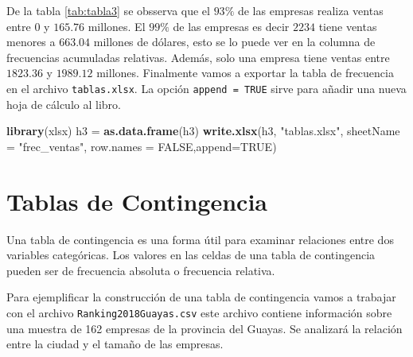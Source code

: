\documentclass[]{book}
\newenvironment{Shaded}{\begin{snugshade}}{\end{snugshade}}
\newcommand{\KeywordTok}[1]{\textcolor[rgb]{0.13,0.29,0.53}{\textbf{#1}}}
\newcommand{\DataTypeTok}[1]{\textcolor[rgb]{0.13,0.29,0.53}{#1}}
\newcommand{\DecValTok}[1]{\textcolor[rgb]{0.00,0.00,0.81}{#1}}
\newcommand{\StringTok}[1]{\textcolor[rgb]{0.31,0.60,0.02}{#1}}
\newcommand{\OtherTok}[1]{\textcolor[rgb]{0.56,0.35,0.01}{#1}}
\newcommand{\OperatorTok}[1]{\textcolor[rgb]{0.81,0.36,0.00}{\textbf{#1}}}
\newcommand{\NormalTok}[1]{#1}
\begin{document}
De la tabla \ref{tab:tabla3} se obsserva que el \(93\%\) de las empresas
realiza ventas entre 0 y \(165.76\) millones. El \(99\%\) de las
empresas es decir \(2234\) tiene ventas menores a \(663.04\) millones de
dólares, esto se lo puede ver en la columna de frecuencias acumuladas
relativas. Además, solo una empresa tiene ventas entre \(1823.36\) y
\(1989.12\) millones. Finalmente vamos a exportar la tabla de frecuencia
en el archivo \texttt{tablas.xlsx}. La opción \texttt{append\ =\ TRUE}
sirve para añadir una nueva hoja de cálculo al libro.

\begin{Shaded}
\begin{Highlighting}[]
\KeywordTok{library}\NormalTok{(xlsx)}
\NormalTok{h3 =}\StringTok{ }\KeywordTok{as.data.frame}\NormalTok{(h3)}
\KeywordTok{write.xlsx}\NormalTok{(h3, }\StringTok{"tablas.xlsx"}\NormalTok{, }\DataTypeTok{sheetName =} \StringTok{"frec_ventas"}\NormalTok{, }\DataTypeTok{row.names =} \OtherTok{FALSE}\NormalTok{,}\DataTypeTok{append=}\OtherTok{TRUE}\NormalTok{)}
\end{Highlighting}
\end{Shaded}

\section{Tablas de Contingencia}\label{tablas-de-contingencia}

Una tabla de contingencia es una forma útil para examinar relaciones
entre dos variables categóricas. Los valores en las celdas de una tabla
de contingencia pueden ser de frecuencia absoluta o frecuencia relativa.

Para ejemplificar la construcción de una tabla de contingencia vamos a
trabajar con el archivo \texttt{Ranking2018Guayas.csv} este archivo
contiene información sobre una muestra de 162 empresas de la provincia
del Guayas. Se analizará la relación entre la ciudad y el tamaño de las
empresas.

\begin{Shaded}
\end{Shaded}
\end{document}
